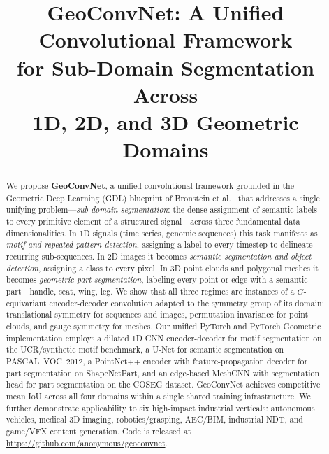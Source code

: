 \documentclass[10pt,conference]{IEEEtran}
\begin{document}
\title{GeoConvNet: A Unified Convolutional Framework\\
       for Sub-Domain Segmentation Across\\
       1D, 2D, and 3D Geometric Domains}

\author{%
}

\maketitle

\begin{abstract}
We propose \textbf{GeoConvNet}, a unified convolutional framework grounded
in the Geometric Deep Learning (GDL) blueprint of Bronstein et
al.~\cite{bronstein2021geometric} that addresses a single unifying
problem---\emph{sub-domain segmentation}: the dense assignment of semantic
labels to every primitive element of a structured signal---across three
fundamental data dimensionalities.  In 1D signals (time series, genomic
sequences) this task manifests as \emph{motif and repeated-pattern
detection}, assigning a label to every timestep to delineate recurring
sub-sequences.  In 2D images it becomes \emph{semantic segmentation and
object detection}, assigning a class to every pixel.  In 3D point clouds
and polygonal meshes it becomes \emph{geometric part segmentation},
labeling every point or edge with a semantic part---handle, seat, wing,
leg.  We show that all three regimes are instances of a $G$-equivariant
encoder-decoder convolution adapted to the symmetry group of its domain:
translational symmetry for sequences and images, permutation invariance for
point clouds, and gauge symmetry for meshes.  Our unified PyTorch and
PyTorch Geometric implementation employs a dilated 1D CNN encoder-decoder
for motif segmentation on the UCR/synthetic motif benchmark, a U-Net for
semantic segmentation on PASCAL~VOC~2012, a PointNet++ encoder with
feature-propagation decoder for part segmentation on ShapeNetPart, and an
edge-based MeshCNN with segmentation head for part segmentation on the
COSEG dataset.  GeoConvNet achieves competitive mean IoU across all four
domains within a single shared training infrastructure.  We further
demonstrate applicability to six high-impact industrial verticals:
autonomous vehicles, medical 3D imaging, robotics/grasping, AEC/BIM,
industrial NDT, and game/VFX content generation.  Code is released at
\url{https://github.com/anonymous/geoconvnet}.
\end{abstract}
\end{document}
